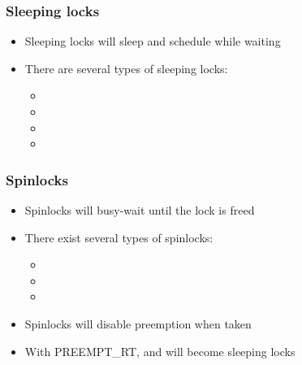 \begin{frame}
  \frametitle{Sleeping locks}
	\begin{itemize}
		\item Sleeping locks will sleep and schedule while waiting
		\item There are several types of sleeping locks:
	\begin{itemize}
		\item {}
		\item {}
		\item {}
		\item {}
	\end{itemize}
	\end{itemize}
\end{frame}

\begin{frame}
  \frametitle{Spinlocks}
	\begin{itemize}
		\item Spinlocks will busy-wait until the lock is freed
		\item There exist several types of spinlocks:
		\begin{itemize}
			\item {}
			\item {}
			\item {}
		\end{itemize}
		\item Spinlocks will disable preemption when taken
		\item With PREEMPT\_RT,  and  will become sleeping locks
	\end{itemize}
\end{frame}

